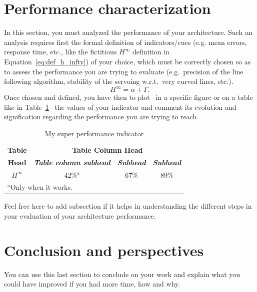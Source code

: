\documentclass[conference]{IEEEtran}
\begin{document}
\section{Performance characterization}
In this section, you must analyzed the performance of your architecture. Such an analysis requires
first the formal definition of indicators/cues (e.g. mean errors, response time, etc., like the
fictitious $H^{\infty}$ definition in Equation~\eqref{eq:def_h_infty}) of your choice, which must be correctly chosen so as to
assess the performance you are trying to evaluate (e.g.\ precision of the line following algorithm,
stability of the servoing w.r.t.\ very curved lines, etc.).
%
\begin{equation}
    H^{\infty} = \alpha + \Gamma.
    \label{eq:def_h_infty}
\end{equation}
%
Once chosen and defined, you have then to plot --in a specific figure or on a table
like in Table~\ref{tab:performance_table}-- the values of your indicator and comment its evolution
and signification regarding the performance you are trying to reach.
%
\begin{table}[htbp]
    \caption{My super performance indicator}
    \begin{center}
        \begin{tabular}{|c|c|c|c|}
            \hline
            \textbf{Table} & \multicolumn{3}{|c|}{\textbf{Table Column Head}}                                                         \\
            \cline{2-4}
            \textbf{Head}  & \textbf{\textit{Table column subhead}}           & \textbf{\textit{Subhead}} & \textbf{\textit{Subhead}} \\
            \hline
            $H^{\infty}$   & 42\%$^{\mathrm{a}}$                              & 67\%                      & 89\%                      \\
            \hline
            \multicolumn{4}{l}{$^{\mathrm{a}}$Only when it works.}
        \end{tabular}
        \label{tab:performance_table}
    \end{center}
\end{table}


Feel free here to add subsection if it helps in understanding the different steps in your
evaluation of your architecture performance.

\section{Conclusion and perspectives}
You can use this last section to conclude on your work and explain what you could have improved if
you had more time, how and why.
\end{document}
